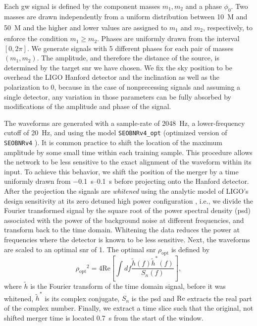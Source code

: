 Each \acrshort{gw} signal is defined by the component masses $m_1, m_2$ and a phase $\phi_0$. Two masses are drawn independently from a uniform distribution between \SI{10}{M_\odot} and \SI{50}{M_\odot} and the higher and lower values are assigned to $m_1$ and $m_2$, respectively, to enforce the condition $m_1\geq m_2$. Phases are uniformly drawn from the interval $\left[0,2\pi\right]$. We generate signals with 5 different phases for each pair of masses $\left(m_1,m_2\right)$. The amplitude, and therefore the distance of the source, is determined by the target \acrshort{snr} we have chosen. We fix the sky position to be overhead the LIGO Hanford detector \cite{LIGOScientific:2014pky} and the inclination as well as the polarization to $0$, because in the case of nonprecessing signals and assuming a single detector, any variation in those parameters can be fully absorbed by modifications of the amplitude and phase of the signal.

The waveforms are generated with a sample-rate of \SI{2048}{\hertz}, a lower-frequency cutoff of \SI{20}{\hertz}, and using the model \verb|SEOBNRv4_opt| \cite{Devine:2016ovp} (optimized version of \verb|SEOBNRv4| \cite{Bohe:2016gbl}). It is common practice to shift the location of the maximum amplitude by some small time within each training sample. This procedure allows the network to be less sensitive to the exact alignment of the waveform within its input. To achieve this behavior, we shift the position of the merger by a time uniformly drawn from \SIrange{-0.1}{0.1}{\second} before projecting onto the Hanford detector. After the projection the signals are \textit{whitened} using the analytic model of LIGO's design sensitivity at its zero detuned high power configuration \cite{lalsuite}, i.e., we divide the Fourier transformed signal by the square root of the power spectral density (\acrshort{psd}) associated with the power of the background noise at different frequencies, and transform back to the time domain. Whitening the data reduces the power at frequencies where the detector is known to be less sensitive. Next, the waveforms are scaled to an optimal \acrshort{snr} of 1. The optimal \acrshort{snr} $\rho_\text{opt}$ is defined by
\begin{equation}
    {\rho_\text{opt}}^2 = 4 \text{Re}\left[\int df \frac{\tilde{h}(f)\tilde{h}^\ast(f)}{S_n(f)}\right],
\end{equation}
where $\tilde{h}$ is the Fourier transform of the time domain signal, before it was whitened, $\tilde{h}^\ast$ is its complex conjugate, $S_n$ is the \acrshort{psd} and $\text{Re}$ extracts the real part of the complex number. Finally, we extract a time slice such that the original, not shifted merger time is located \SI{0.7}{\second} from the start of the window.

